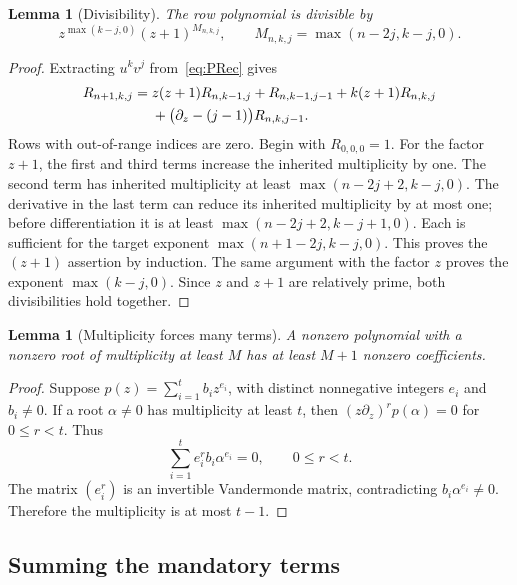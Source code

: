 \documentclass[11pt]{article}
\numberwithin{equation}{section}
\newtheorem{lemma}[theorem]{Lemma}
\theoremstyle{definition}
\theoremstyle{remark}
\begin{document}
\begin{lemma}[Divisibility]\label{lem:divisibility}
The row polynomial is divisible by
\begin{equation}\label{eq:divisibility}
 z^{\max(k-j,0)}(z+1)^{M_{n,k,j}},
 \qquad M_{n,k,j}=\max(n-2j,k-j,0).
\end{equation}
\end{lemma}
\begin{proof}
Extracting $u^kv^j$ from~\eqref{eq:PRec} gives
\begin{align}\label{eq:rowrec}
 R_{n+1,k,j}={}&z(z+1)R_{n,k-1,j}+R_{n,k-1,j-1}
              +k(z+1)R_{n,k,j}\notag\\
 &+\bigl(\partial_z-(j-1)\bigr)R_{n,k,j-1}.
\end{align}
Rows with out-of-range indices are zero. Begin with $R_{0,0,0}=1$.
For the factor $z+1$, the first and third terms increase the inherited
multiplicity by one. The second term has inherited multiplicity at least
$\max(n-2j+2,k-j,0)$. The derivative in the last term can reduce its inherited
multiplicity by at most one; before differentiation it is at least
$\max(n-2j+2,k-j+1,0)$. Each is sufficient for the target exponent
$\max(n+1-2j,k-j,0)$. This proves the $(z+1)$ assertion by induction.
The same argument with the factor $z$ proves the exponent $\max(k-j,0)$.
Since $z$ and $z+1$ are relatively prime, both divisibilities hold together.
\end{proof}

\begin{lemma}[Multiplicity forces many terms]\label{lem:sparse}
A nonzero polynomial with a nonzero root of multiplicity at least $M$ has
at least $M+1$ nonzero coefficients.
\end{lemma}
\begin{proof}
Suppose $p(z)=\sum_{i=1}^t b_i z^{e_i}$, with distinct nonnegative integers
$e_i$ and $b_i\ne0$. If a root $\alpha\ne0$ has multiplicity at least $t$,
then $(z\partial_z)^r p(\alpha)=0$ for $0\le r<t$. Thus
\[
 \sum_{i=1}^t e_i^r b_i\alpha^{e_i}=0,\qquad 0\le r<t.
\]
The matrix $(e_i^r)$ is an invertible Vandermonde matrix, contradicting
$b_i\alpha^{e_i}\ne0$. Therefore the multiplicity is at most $t-1$.
\end{proof}

\subsection{Summing the mandatory terms}
\end{document}
